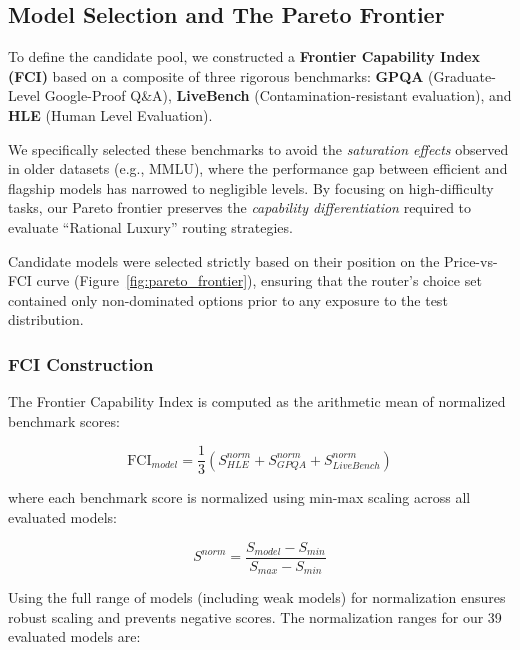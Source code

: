 
\subsection{Model Selection and The Pareto Frontier}

To define the candidate pool, we constructed a \textbf{Frontier Capability Index (FCI)} based on a composite of three rigorous benchmarks: \textbf{GPQA} (Graduate-Level Google-Proof Q\&A), \textbf{LiveBench} (Contamination-resistant evaluation), and \textbf{HLE} (Human Level Evaluation). 

We specifically selected these benchmarks to avoid the \textit{saturation effects} observed in older datasets (e.g., MMLU), where the performance gap between efficient and flagship models has narrowed to negligible levels. By focusing on high-difficulty tasks, our Pareto frontier preserves the \textit{capability differentiation} required to evaluate ``Rational Luxury'' routing strategies.

Candidate models were selected strictly based on their position on the Price-vs-FCI curve (Figure~\ref{fig:pareto_frontier}), ensuring that the router's choice set contained only non-dominated options prior to any exposure to the test distribution.

\subsubsection{FCI Construction}

The Frontier Capability Index is computed as the arithmetic mean of normalized benchmark scores:

\begin{equation}
\text{FCI}_{model} = \frac{1}{3} \left( S^{norm}_{HLE} + S^{norm}_{GPQA} + S^{norm}_{LiveBench} \right)
\end{equation}

where each benchmark score is normalized using min-max scaling across all evaluated models:

\begin{equation}
S^{norm} = \frac{S_{model} - S_{min}}{S_{max} - S_{min}}
\end{equation}

Using the full range of models (including weak models) for normalization ensures robust scaling and prevents negative scores. The normalization ranges for our 39 evaluated models are:

